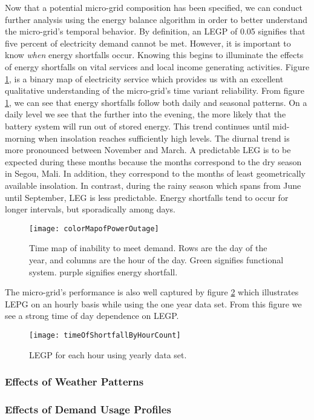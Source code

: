 \documentclass{article}
\begin{document}
Now that a potential micro-grid composition has been specified, we can conduct further analysis using the energy balance algorithm in order to better understand the micro-grid's temporal behavior.
By definition, an LEGP of 0.05 signifies that five percent of electricity demand cannot be met.
However, it is important to know \emph{when} energy shortfalls occur. 
Knowing this begins to illuminate the effects of energy shortfalls on vital services and local income generating activities. 
Figure \ref{shortfallMap}, is a binary map of electricity service which provides us with an excellent qualitative understanding of the micro-grid's time variant reliability. 
From figure \ref{shortfallMap}, we can see that energy shortfalls follow both daily and seasonal patterns. 
On a daily level we see that the further into the evening, the more likely that the battery system will run out of stored energy. 
This trend continues until mid-morning when insolation reaches sufficiently high levels.
The diurnal trend is more pronounced between November and March.
A predictable LEG is to be expected during these months because the months correspond to the dry season in Segou, Mali.
In addition, they correspond to the months of least geometrically available insolation.
In contrast, during the rainy season which spans from June until September, LEG is less predictable. 
Energy shortfalls tend to occur for longer intervals, but sporadically among days.  

\begin{figure}[ht] 
  \centering
    \texttt{[image: colorMapofPowerOutage]}
  \caption{Time map of inability to meet demand. Rows are the day of the year, and columns are the hour of the day. Green signifies functional system. purple signifies energy shortfall.}
\label{shortfallMap}
\end{figure}

The micro-grid's performance is also well captured by figure \ref{histHourBin} which illustrates LEPG on an hourly basis while using the one year data set. 
From this figure we see a strong time of day dependence on LEGP. 

\begin{figure}[ht] 
  \centering
    \texttt{[image: timeOfShortfallByHourCount]}
  \caption{LEGP for each hour using yearly data set.}
\label{histHourBin}
\end{figure}

\subsubsection{Effects of Weather Patterns}



\subsubsection{Effects of Demand Usage Profiles}

 
\end{document}
